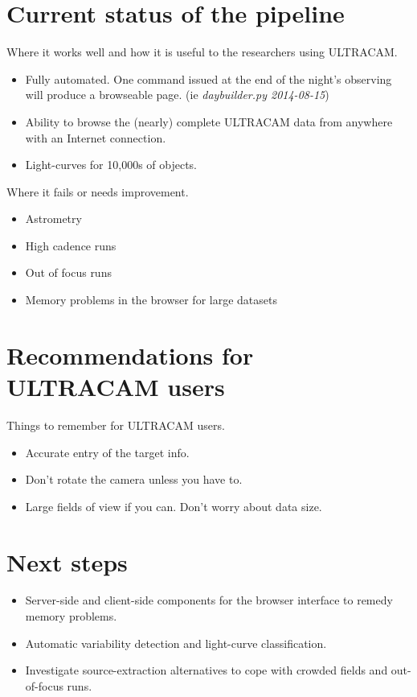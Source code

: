 
\section{Current status of the pipeline}

Where it works well and how it is useful to the researchers using ULTRACAM.
\begin{itemize}
  \item Fully automated. One command issued at the end of the night's observing will produce a browseable page. (ie \emph{daybuilder.py 2014-08-15})
  \item Ability to browse the (nearly) complete ULTRACAM data from anywhere with an Internet connection. 
  \item Light-curves for 10,000s of objects.
\end{itemize}

Where it fails or needs improvement.
\begin{itemize}
  \item Astrometry
  \item High cadence runs
  \item Out of focus runs
  \item Memory problems in the browser for large datasets 
\end{itemize}

\section{Recommendations for ULTRACAM users}

Things to remember for ULTRACAM users. 
\begin{itemize}
	\item Accurate entry of the target info.
	\item Don't rotate the camera unless you have to.
	\item Large fields of view if you can. Don't worry about data size. 
\end{itemize} 

\section{Next steps}
\begin{itemize}
	\item Server-side and client-side components for the browser interface to remedy memory problems.
	\item Automatic variability detection and light-curve classification. 
	\item Investigate source-extraction alternatives to cope with crowded fields and out-of-focus runs. 
\end{itemize} 
 

